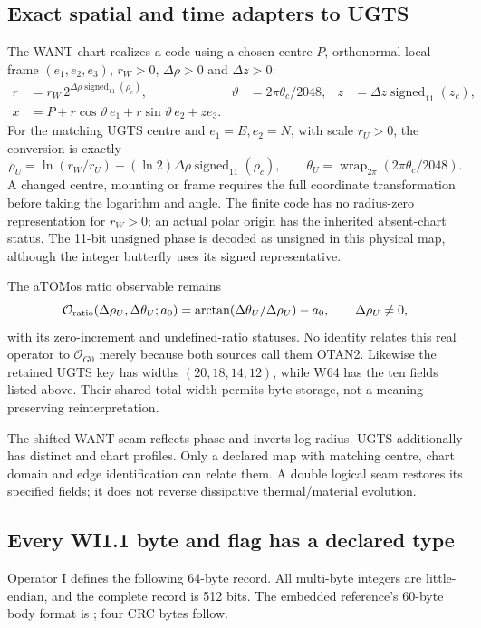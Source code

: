 \subsection{Exact spatial and time adapters to UGTS}
The WANT chart realizes a code using a chosen centre $P$, orthonormal local
frame $(e_1,e_2,e_3)$, $r_W>0$, $\Delta\rho>0$ and $\Delta z>0$:
\begin{align}
 r&=r_W\,2^{\Delta\rho\operatorname{signed}_{11}(\rho_c)},
 &\vartheta&=2\pi\theta_c/2048,
 &z&=\Delta z\operatorname{signed}_{11}(z_c),\\
 x&=P+r\cos\vartheta\,e_1+r\sin\vartheta\,e_2+z e_3.
\end{align}
For the matching UGTS centre and $e_1=E,e_2=N$, with scale $r_U>0$, the
conversion is exactly
\begin{equation}
 \rho_U=\ln(r_W/r_U)+(\ln2)\Delta\rho\operatorname{signed}_{11}(\rho_c),
 \qquad \theta_U=\operatorname{wrap}_{2\pi}(2\pi\theta_c/2048).
\end{equation}
A changed centre, mounting or frame requires the full coordinate transformation
before taking the logarithm and angle. The finite code has no radius-zero
representation for $r_W>0$; an actual polar origin has the inherited absent-chart
status. The 11-bit unsigned phase is decoded as unsigned in this physical map,
although the integer butterfly uses its signed representative.

The aTOMos ratio observable remains
\[
 \mathcal O_{\rm ratio}(\Delta\rho_U,\Delta\theta_U;a_0)
 =\arctan(\Delta\theta_U/\Delta\rho_U)-a_0,
 \qquad\Delta\rho_U\ne0,
\]
with its zero-increment and undefined-ratio statuses. No identity relates this
real operator to $\mathcal O_{G0}$ merely because both sources call them OTAN2.
Likewise the retained UGTS key has widths $(20,18,14,12)$, while W64 has the ten
fields listed above. Their shared total width permits byte storage, not a
meaning-preserving reinterpretation.

The shifted WANT seam reflects phase and inverts log-radius. UGTS additionally
has distinct  and  chart
profiles. Only a declared map with matching centre, chart domain and edge
identification can relate them. A double logical seam restores its specified
fields; it does not reverse dissipative thermal/material evolution.

\subsection{Every WI1.1 byte and flag has a declared type}
Operator I defines the following 64-byte record. All multi-byte integers are
little-endian, and the complete record is 512 bits. The embedded reference's
60-byte body format is ; four CRC bytes follow.

